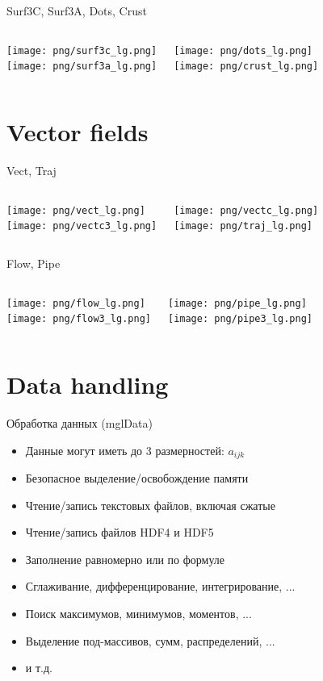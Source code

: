 \documentclass[color=usenames]{beamer}
\begin{document}
\begin{frame}{Surf3C, Surf3A, Dots, Crust}
\begin{columns}
\texttt{[image: png/surf3c\_lg.png]}\\
\texttt{[image: png/surf3a\_lg.png]}

\texttt{[image: png/dots\_lg.png]}\\
\texttt{[image: png/crust\_lg.png]}

\end{columns}
\end{frame}


\section{Vector fields}

\begin{frame}{Vect, Traj}
\begin{columns}
\texttt{[image: png/vect\_lg.png]}\\
\texttt{[image: png/vectc3\_lg.png]}

\texttt{[image: png/vectc\_lg.png]}\\
\texttt{[image: png/traj\_lg.png]}

\end{columns}
\end{frame}

\begin{frame}{Flow, Pipe}
\begin{columns}
\texttt{[image: png/flow\_lg.png]}\\
\texttt{[image: png/flow3\_lg.png]}

\texttt{[image: png/pipe\_lg.png]}\\
\texttt{[image: png/pipe3\_lg.png]}

\end{columns}
\end{frame}


\section{Data handling}
\begin{frame}{Обработка данных (mglData)}
\Large
\begin{itemize}
\item Данные могут иметь до 3 размерностей: $a_{ijk}$
\item Безопасное выделение/освобождение памяти
\item Чтение/запись текстовых файлов, включая сжатые
\item Чтение/запись файлов HDF4 и HDF5 
\item Заполнение равномерно или по формуле
\item Сглаживание, дифференцирование, интегрирование, ...
\item Поиск максимумов, минимумов, моментов, ...
\item Выделение под-массивов, сумм, распределений, ...
\item и т.д.
\end{itemize}
\end{frame}
\end{document}
